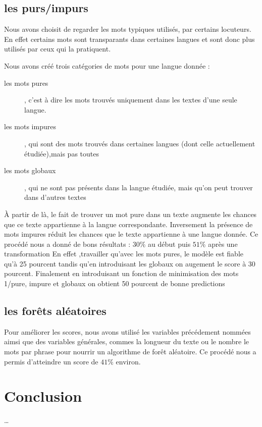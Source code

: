 \documentclass[a4paper]{article}
\begin{document}
\subsection{les purs/impurs}
Nous avons choisit de regarder les mots typiques utilisés, par
certains locuteurs. En effet certains mots sont transparants dans
certaines langues et sont donc plus utilisés par ceux qui la
pratiquent.

Nous avons créé trois catégories de mots pour une langue donnée :
\begin{description}
\item[les mots pures], c'est à dire les mots trouvés uniquement dans
  les textes d'une seule langue.
\item[les mots impures], qui sont des mots trouvés dans certaines
  langues (dont celle actuellement étudiée),mais pas toutes
\item[les mots globaux], qui ne sont pas présents dans la langue
  étudiée, mais qu'on peut trouver dans d'autres textes
\end{description}
À partir de là, le fait de trouver un mot pure dans un texte augmente
les chances que ce texte appartienne à la langue correspondante.
Inversement la présence de mots impures réduit les chances que le
texte appartienne à une langue donnée. 
Ce procédé nous a donné de bons résultats : $30\%$ au début puis
$51\%$ après une transformation {\color{red} En effet ,travailler qu'avec
les mots pures, le modèle est fiable qu'à 25 pourcent tandis qu'en introduisant
les globaux on augement le score à 30 pourcent. Finalement en introduisant un
fonction de minimisation des mots 1/pure, impure et globaux on obtient 50 pourcent de bonne predictions}

\subsection{les forêts aléatoires}
Pour améliorer les scores, nous avons utilisé les variables
précédement nommées aimsi que des variables générales, commes la
longueur du texte ou le nombre le mots par phrase pour nourrir un
algorithme de forêt aléatoire. Ce procédé nous a permis d'atteindre un
score de $41\%$ environ.
\section{Conclusion}
…
\end{document}
